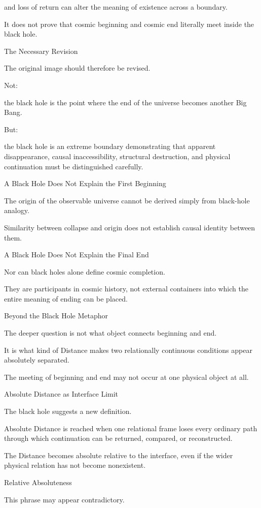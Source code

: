 and loss of return can alter the meaning of existence across a boundary.

It does not prove that cosmic beginning and cosmic end literally meet inside the black hole.

The Necessary Revision

The original image should therefore be revised.

Not:

the black hole is the point where the end of the universe becomes another Big Bang.

But:

the black hole is an extreme boundary demonstrating that apparent disappearance, causal inaccessibility, structural destruction, and physical continuation must be distinguished carefully.

A Black Hole Does Not Explain the First Beginning

The origin of the observable universe cannot be derived simply from black-hole analogy.

Similarity between collapse and origin does not establish causal identity between them.

A Black Hole Does Not Explain the Final End

Nor can black holes alone define cosmic completion.

They are participants in cosmic history, not external containers into which the entire meaning of ending can be placed.

Beyond the Black Hole Metaphor

The deeper question is not what object connects beginning and end.

It is what kind of Distance makes two relationally continuous conditions appear absolutely separated.

The meeting of beginning and end may not occur at one physical object at all.

Absolute Distance as Interface Limit

The black hole suggests a new definition.

Absolute Distance is reached when one relational frame loses every ordinary path through which continuation can be returned, compared, or reconstructed.

The Distance becomes absolute relative to the interface, even if the wider physical relation has not become nonexistent.

Relative Absoluteness

This phrase may appear contradictory.


